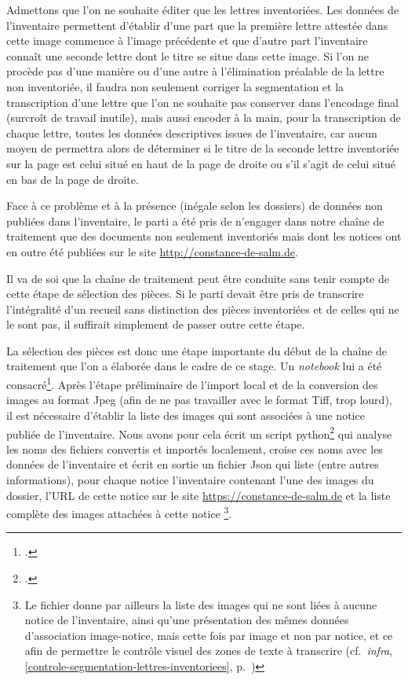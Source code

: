 \documentclass[a4paper,12pt,twoside]{book}
\begin{document}
				Admettons que l'on ne souhaite éditer que les lettres inventoriées. Les données de l'inventaire permettent d'établir d'une part que la première lettre attestée dans cette image commence à l'image précédente et que d'autre part l'inventaire connaît une seconde lettre dont le titre se situe dans cette image. Si l'on ne procède pas d'une manière ou d'une autre à l'élimination préalable de la lettre non inventoriée, il faudra non seulement corriger la segmentation et la transcription d'une lettre que l'on ne souhaite pas conserver dans l'encodage final (surcroît de travail inutile), mais aussi encoder à la main, pour la transcription de chaque lettre, toutes les données descriptives issues de l'inventaire, car aucun moyen de permettra alors de déterminer si le titre de la seconde lettre inventoriée sur la page est celui situé en haut de la page de droite ou s'il s'agit de celui situé en bas de la page de droite.
						
				Face à ce problème et à la présence (inégale selon les dossiers) de données non publiées dans l'inventaire, le parti a été pris de n'engager dans notre chaîne de traitement que des documents non seulement inventoriés mais dont les notices ont en outre été publiées sur le site \url{http://constance-de-salm.de}.
				
				Il va de soi que la chaîne de traitement peut être conduite sans tenir compte de cette étape de sélection des pièces. Si le parti devait être pris de transcrire l'intégralité d'un recueil sans distinction des pièces inventoriées et de celles qui ne le sont pas, il suffirait simplement de passer outre cette étape.
				
				La sélection des pièces est donc une étape importante du début de la chaîne de traitement que l'on a élaborée dans le cadre de ce stage. Un \textit{notebook} lui a été consacré\footcite{biayPreparerTraitementDossier2022}. Après l'étape préliminaire de l'import local et de la conversion des images au format Jpeg (afin de ne pas travailler avec le format Tiff, trop lourd), il est nécessaire d'établir la liste des images qui sont associées à une notice publiée de l'inventaire. Nous avons pour cela écrit un script python\footcite{biayDonneesImagesPy2022} qui analyse les noms des fichiers convertis et importés localement, croise ces noms avec les données de l'inventaire et écrit en sortie un fichier Json qui liste (entre autres informations), pour chaque notice l'inventaire contenant l'une des images du dossier, l'URL de cette notice sur le site \url{https://constance-de-salm.de} et la liste complète des images attachées à cette notice
				\footnote{Le fichier donne par ailleurs la liste des images qui ne sont liées à aucune notice de l'inventaire, ainsi qu'une présentation des mêmes données d'association image-notice, mais cette fois par image et non par notice, et ce afin de permettre le contrôle visuel des zones de texte à transcrire (cf.~\textit{infra}, \ref{controle-segmentation-lettres-inventoriees}, p.~\pageref{controle-segmentation-lettres-inventoriees})}.
				
\end{document}
